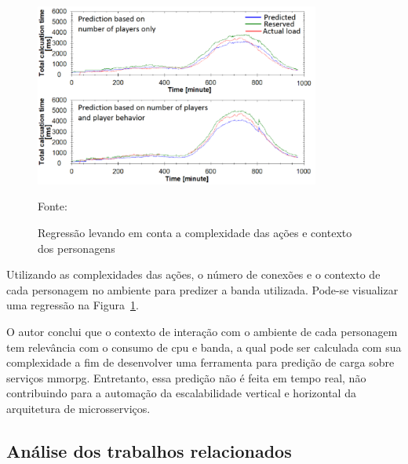 \begin{figure}[htb!]
\caption{Regressão levando em conta a complexidade das ações e contexto dos personagens}
\label{fig:regressao_complexidade}
\includegraphics[height=6.0cm]{img/cap2/network_regressao_complexidade.png}
\centering

Fonte:~\cite{6374456}
\end{figure}



Utilizando as complexidades das ações, o número de conexões e o contexto de cada personagem no ambiente para predizer a banda utilizada.
%
Pode-se visualizar uma regressão na Figura~\ref{fig:regressao_complexidade}.



O autor conclui que o contexto de interação com o ambiente de cada personagem tem relevância com o consumo de \ac{cpu} e banda, a qual pode ser calculada com sua complexidade a fim de desenvolver uma ferramenta para predição de carga sobre serviços \ac{mmorpg}.
%
Entretanto, essa predição não é feita em tempo real, não contribuindo para a automação da escalabilidade vertical e horizontal da arquitetura de microsserviços.



\subsection{Análise dos trabalhos relacionados}
\label{sec:similares_analise}
